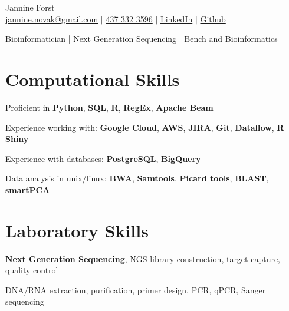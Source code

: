 \documentclass[11pt]{article}
\begin{document}
\begin{center}
    {\fontsize{36}{36}\selectfont\intermedium Jannine Forst} \\ \bigskip
    {\color{icnclr}\faEnvelope[regular]} \href{mailto:jannine.novak@gmail.com}{jannine.novak@gmail.com} $|$ 
    {\color{icnclr}} \href{tel:1234567890}{437 332 3596} $|$
    \href{https://www.linkedin.com/in/jannine-forst/}{\color{icnclr}\faLinkedin} 
    \href{https://www.linkedin.com/in/jannine-forst/} {LinkedIn} $|$
    \href{https://github.com/jannine-forst}
    {\color{icnclr}\faGithub} \href{https://github.com/jannine-forst} {Github}
    

    \item{Bioinformatician | Next Generation Sequencing | Bench and Bioinformatics}
\end{center}

\section{Computational Skills}
\begin{description}
    \item Proficient in \textbf{Python}, \textbf{SQL}, \textbf{R}, \textbf{RegEx}, \textbf{Apache Beam}
    \item Experience working with: \textbf{Google Cloud}, \textbf{AWS}, \textbf{JIRA}, \textbf{Git}, \textbf{Dataflow}, \textbf{R Shiny}
    \item Experience with databases: \textbf{PostgreSQL}, \textbf{BigQuery}
    \item Data analysis in unix/linux: \textbf{BWA}, \textbf{Samtools}, \textbf{Picard tools}, \textbf{BLAST}, \textbf{smartPCA}
\end{description}

\section{Laboratory Skills}
\begin{description}
    \item \textbf{Next Generation Sequencing}, NGS library construction, target capture, quality control
    \item DNA/RNA extraction, purification, primer design, PCR, qPCR, Sanger sequencing
\end{description}
\end{document}
